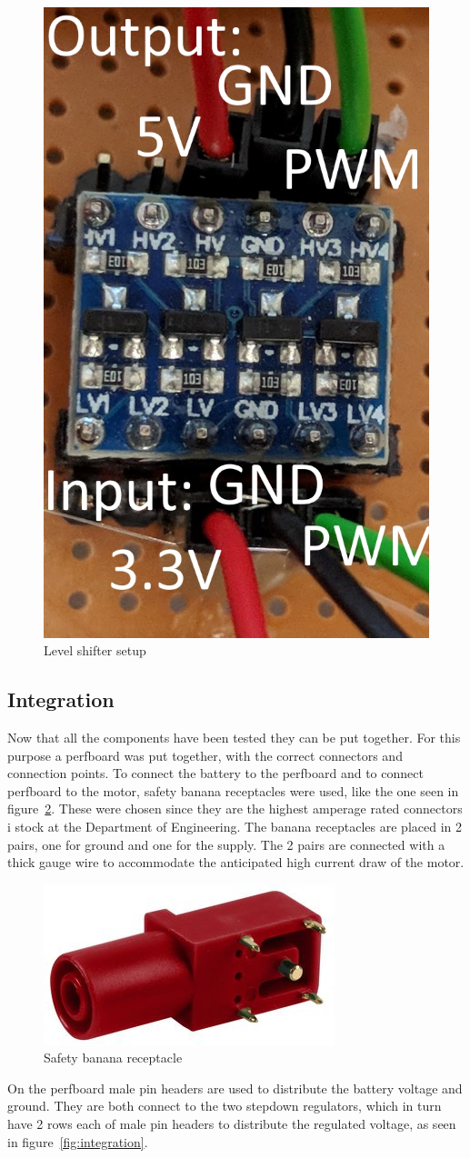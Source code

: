 \begin{figure}[H]
\centering
\includegraphics[width=0.3\linewidth]{Images/Implementation/level_shift_setup}
\caption{Level shifter setup}
\label{fig:levelshifter_setup}
\end{figure}

\subsection{Integration}
\label{sec:hardware_int}
Now that all the components have been tested they can be put together. For this purpose a perfboard\cite{perfboard} was put together, with the correct connectors and connection points.
To connect the battery to the perfboard and to connect perfboard to the motor, safety banana receptacles\cite{banana-connector} were used, like the one seen in figure~\ref{fig:banana_connector}. These were chosen since they are the highest amperage rated connectors i stock at the Department of Engineering. The banana receptacles are placed in 2 pairs, one for ground and one for the supply. The 2 pairs are connected with a thick gauge wire to accommodate the anticipated high current draw of the motor. 

\begin{figure}[h]
\centering
\includegraphics[width=0.3\linewidth]{Images/Design/safety-banana-receptical}
\caption{Safety banana receptacle\cite{banana-connector}}
\label{fig:banana_connector}
\end{figure}


On the perfboard male pin headers are used to distribute the battery voltage and ground. They are both connect to the two stepdown regulators, which in turn have 2 rows each of male pin headers to distribute the regulated voltage, as seen in figure~\ref{fig:integration}. 

